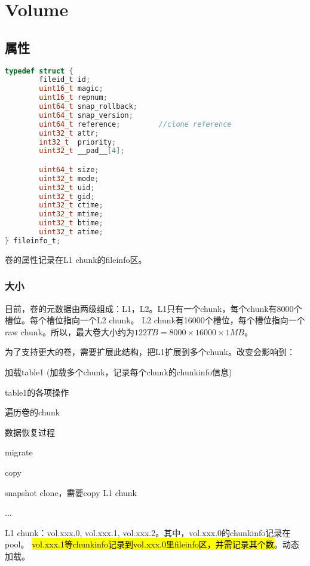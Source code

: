 \chapter{Volume}

\section{属性}

\begin{lstlisting}[language=c,frame=single]
typedef struct {
        fileid_t id;
        uint16_t magic;
        uint16_t repnum;
        uint64_t snap_rollback;
        uint64_t snap_version;
        uint64_t reference;         //clone reference
        uint32_t attr;
        int32_t  priority;
        uint32_t __pad__[4];

        uint64_t size;
        uint32_t mode;
        uint32_t uid;
        uint32_t gid;
        uint32_t ctime;
        uint32_t mtime;
        uint32_t btime;
        uint32_t atime;
} fileinfo_t;
\end{lstlisting}

卷的属性记录在L1 chunk的fileinfo区。

\subsection{大小}

目前，卷的元数据由两级组成：L1，L2。L1只有一个chunk，每个chunk有8000个槽位。每个槽位指向一个L2 chunk。
L2 chunk有16000个槽位，每个槽位指向一个raw chunk。所以，最大卷大小约为$122TB = 8000 \times 16000 \times 1MB$。

为了支持更大的卷，需要扩展此结构，把L1扩展到多个chunk。改变会影响到：
\begin{compactitem}
\item 加载table1 (加载多个chunk，记录每个chunk的chunkinfo信息)
\item table1的各项操作
\item 遍历卷的chunk
\item 数据恢复过程
\item migrate
\item copy
\item snapshot clone，需要copy L1 chunk
\item ...
\end{compactitem}

L1 chunk：vol.xxx.0, vol.xxx.1, vol.xxx.2。其中，vol.xxx.0的chunkinfo记录在pool。
\hl{vol.xxx.1等chunkinfo记录到vol.xxx.0里fileinfo区，并需记录其个数}。动态加载。


